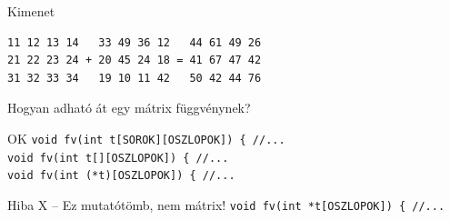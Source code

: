 \documentclass[usenames,dvipsnames,aspectratio=169]{beamer}
\begin{document}
\begin{frame}
  \scriptsize
  \begin{exampleblock}{}
    \vspace{-.2cm}
    
    \vspace{-.2cm}
  \end{exampleblock}
\end{frame}

\begin{frame}[fragile]
  \begin{block}{Kimenet}
    \vspace{-.3cm}
    \begin{verbatim}
11 12 13 14   33 49 36 12   44 61 49 26 
21 22 23 24 + 20 45 24 18 = 41 67 47 42 
31 32 33 34   19 10 11 42   50 42 44 76
\end{verbatim}
    \vspace{-.2cm}
  \end{block}
  \vfill
  Hogyan adható át egy mátrix függvénynek?\\
  \begin{exampleblock}{OK \checkmark}
    \vspace{-.1cm}
    \texttt{void fv(int t[SOROK][OSZLOPOK]) \{ //...\\
    void fv(int t[][OSZLOPOK]) \{ //...\\
    void fv(int (*t)[OSZLOPOK]) \{ //...}
  \end{exampleblock}
  \begin{alertblock}{Hiba X -- Ez mutatótömb, nem mátrix!}
    \vspace{-.1cm}
    \texttt{void fv(int *t[OSZLOPOK]) \{ //...}
  \end{alertblock}
\end{frame}

\begin{frame}
  \begin{exampleblock}{}
    
  \end{exampleblock}
\end{frame}

\begin{frame}
  \scriptsize
  \begin{exampleblock}{}
    
  \end{exampleblock}
\end{frame}
\end{document}
